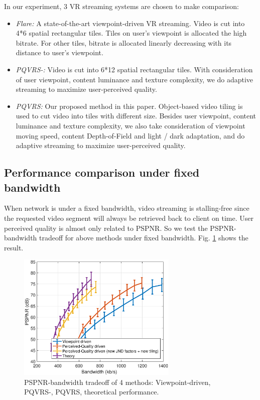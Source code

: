 In our experiment, 3 VR streaming systems are chosen to make comparison:

\begin{itemize}

\item \emph{Flare:} A state-of-the-art viewpoint-driven VR streaming. Video is cut into 4*6 spatial rectangular tiles. Tiles on user's viewpoint is allocated the high bitrate. For other tiles, bitrate is allocated linearly decreasing with its distance to user's viewpoint.

\item \emph{PQVRS-:} Video is cut into 6*12 spatial rectangular tiles. With consideration of user viewpoint, content luminance and texture complexity, we do adaptive streaming to maximize user-perceived quality.

\item \emph{PQVRS:} Our proposed method in this paper. Object-based video tiling is used to cut video into tiles with different size. Besides user viewpoint, content luminance and texture complexity, we also take consideration of viewpoint moving speed, content Depth-of-Field and light / dark adaptation, and do adaptive streaming to maximize user-perceived quality.

\end{itemize}

\subsection{Performance comparison under fixed bandwidth}

When network is under a fixed bandwidth, video streaming is stalling-free since the requested video segment will always be retrieved back to client on time. User perceived quality is almost only related to PSPNR. So we test the PSPNR-bandwidth tradeoff for above methods under fixed bandwidth. Fig. \ref{practical_imp} shows the result.

  \begin{figure}
  \centering
  \includegraphics[width=3in]{images/practical_improvement.eps}
  \caption{PSPNR-bandwidth tradeoff of 4 methods: Viewpoint-driven, PQVRS-, PQVRS, theoretical performance.}
  \label{practical_imp}
  \end{figure}

